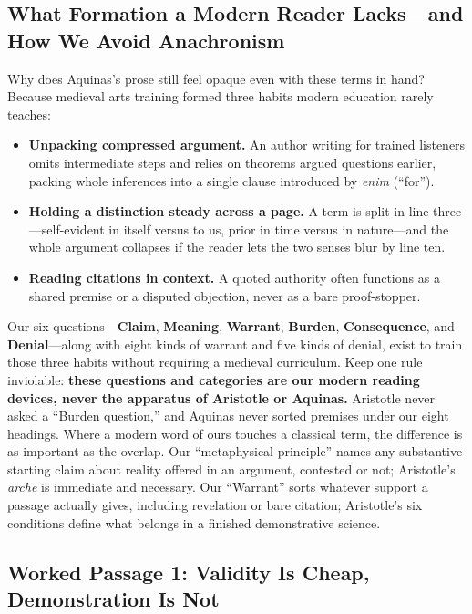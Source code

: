 \subsection{What Formation a Modern Reader Lacks---and How We Avoid Anachronism}

Why does Aquinas's prose still feel opaque even with these terms in hand? Because medieval arts training formed three habits modern education rarely teaches:

\begin{itemize}
\item \textbf{Unpacking compressed argument.} An author writing for trained listeners omits intermediate steps and relies on theorems argued questions earlier, packing whole inferences into a single clause introduced by \emph{enim} (``for'').
\item \textbf{Holding a distinction steady across a page.} A term is split in line three---self-evident in itself versus to us, prior in time versus in nature---and the whole argument collapses if the reader lets the two senses blur by line ten.
\item \textbf{Reading citations in context.} A quoted authority often functions as a shared premise or a disputed objection, never as a bare proof-stopper.
\end{itemize}

Our six questions---\textbf{Claim}, \textbf{Meaning}, \textbf{Warrant}, \textbf{Burden}, \textbf{Consequence}, and \textbf{Denial}---along with eight kinds of warrant and five kinds of denial, exist to train those three habits without requiring a medieval curriculum. Keep one rule inviolable: \textbf{these questions and categories are our modern reading devices, never the apparatus of Aristotle or Aquinas.} Aristotle never asked a ``Burden question,'' and Aquinas never sorted premises under our eight headings. Where a modern word of ours touches a classical term, the difference is as important as the overlap. Our ``metaphysical principle'' names any substantive starting claim about reality offered in an argument, contested or not; Aristotle's \emph{arche} is immediate and necessary. Our ``Warrant'' sorts whatever support a passage actually gives, including revelation or bare citation; Aristotle's six conditions define what belongs in a finished demonstrative science.

\subsection{Worked Passage 1: Validity Is Cheap, Demonstration Is Not}

